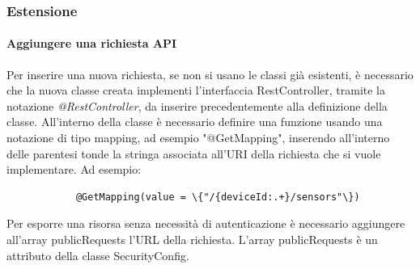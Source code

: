	\subsubsection{Estensione}
		\paragraph{Aggiungere una richiesta API}
			Per inserire una nuova richiesta, se non si usano le classi già esistenti, è necessario che la nuova classe creata implementi l'interfaccia RestController, tramite la notazione \textit{@RestController}, da inserire precedentemente alla definizione della classe.
			\newline
			All'interno della classe è necessario definire una funzione usando una notazione di tipo mapping, ad esempio "@GetMapping", inserendo all'interno delle parentesi tonde la stringa associata all'URI della richiesta che si vuole implementare.
			Ad esempio:
			\begin{verbatim}
			@GetMapping(value = \{"/{deviceId:.+}/sensors"\})
			\end{verbatim}
			Per esporre una risorsa senza necessità di autenticazione è necessario aggiungere all'array publicRequests l'URL della richiesta. L'array publicRequests è un attributo della classe SecurityConfig.
